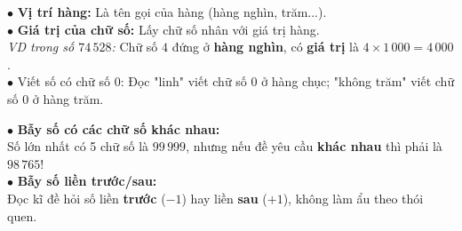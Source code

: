 \documentclass[14pt,a4paper,oneside]{extbook}
\begin{document}
\vspace{2.5mm}

\noindent
\begin{minipage}[t]{0.54\textwidth}
  \begin{tcolorbox}[
    enhanced,
    title={\footnotesize\bfseries\color{white}\faLightbulbO\ Mẹo phân biệt "Giá trị chữ số" \& "Hàng"},
    colback=green!3!white,
    colframe=green!60!black,
    arc=2.5mm, boxrule=0.8pt, top=1.8mm, bottom=1.8mm, left=2.2mm, right=2.2mm
  ]
    \footnotesize
    $\bullet$ \textbf{Vị trí hàng:} Là tên gọi của hàng (hàng nghìn, trăm...).\\
    $\bullet$ \textbf{Giá trị của chữ số:} Lấy chữ số nhân với giá trị hàng.\\
    \textit{VD trong số $74\,528$:} Chữ số $4$ đứng ở \textbf{hàng nghìn}, có \textbf{giá trị} là $4 \times 1\,000 = 4\,000$.\\
    $\bullet$ Viết số có chữ số 0: Đọc "linh" viết chữ số 0 ở hàng chục; "không trăm" viết chữ số 0 ở hàng trăm.
  \end{tcolorbox}
\end{minipage}%
\hfill
\begin{minipage}[t]{0.44\textwidth}
  \begin{tcolorbox}[
    enhanced,
    title={\footnotesize\bfseries\color{white}\faExclamationTriangle\ Mẹo tránh bẫy trắc nghiệm},
    colback=red!2!white,
    colframe=red!70!black,
    arc=2.5mm, boxrule=0.8pt, top=1.8mm, bottom=1.8mm, left=2.2mm, right=2.2mm
  ]
    \footnotesize
    $\bullet$ \textbf{Bẫy số có các chữ số khác nhau:}\\
    Số lớn nhất có 5 chữ số là $99\,999$, nhưng nếu đề yêu cầu \textbf{khác nhau} thì phải là $98\,765$!\\
    $\bullet$ \textbf{Bẫy số liền trước/sau:}\\
    Đọc kĩ đề hỏi số liền \textbf{trước} ($-1$) hay liền \textbf{sau} ($+1$), không làm ẩu theo thói quen.
  \end{tcolorbox}
\end{minipage}
\end{document}

